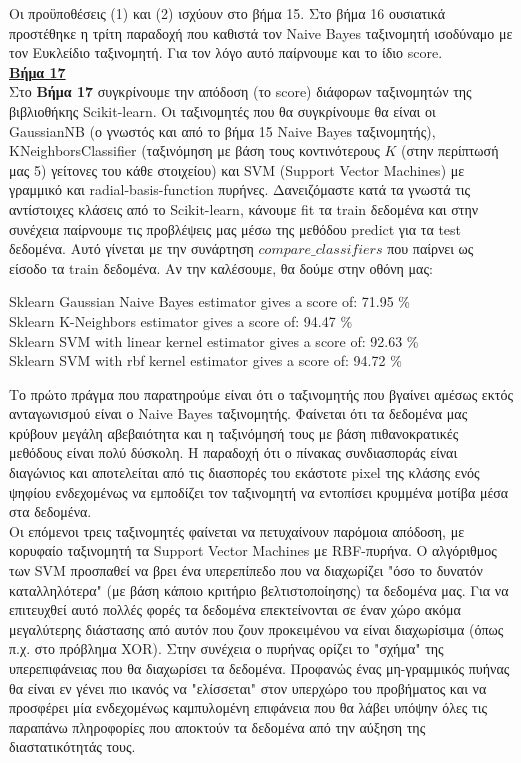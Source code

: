 \documentclass[11pt]{article} %
\begin{document}
Οι προϋποθέσεις (1) και (2) ισχύουν στο βήμα 15. Στο βήμα 16 ουσιατικά προστέθηκε η τρίτη παραδοχή που καθιστά τον Naive Bayes ταξινομητή ισοδύναμο με τον Ευκλείδιο ταξινομητή. Για τον λόγο αυτό παίρνουμε και το ίδιο score.\\

\underline{\textbf{Βήμα 17}}\\

Στο \textbf{Βήμα 17} συγκρίνουμε την απόδοση (το score) διάφορων ταξινομητών της βιβλιοθήκης Scikit-learn. Οι ταξινομητές που θα συγκρίνουμε θα είναι οι GaussianNB (ο γνωστός και από το βήμα 15 Naive Bayes ταξινομητής), KNeighborsClassifier (ταξινόμηση με βάση τους κοντινότερους $Κ$ (στην περίπτωσή μας 5) γείτονες του κάθε στοιχείου) και SVM (Support Vector Machines) με γραμμικό και radial-basis-function πυρήνες. Δανειζόμαστε κατά τα γνωστά τις αντίστοιχες κλάσεις από το Scikit-learn, κάνουμε fit τα train δεδομένα και στην συνέχεια παίρνουμε τις προβλέψεις μας μέσω της μεθόδου predict για τα test δεδομένα. Αυτό γίνεται με την συνάρτηση $compare\_classifiers$ που παίρνει ως είσοδο τα train δεδομένα. Αν την καλέσουμε, θα δούμε στην οθόνη μας:\\
\begin{center}
Sklearn Gaussian Naive Bayes estimator gives a score of: 71.95 \%\\
Sklearn K-Neighbors estimator gives a score of: 94.47 \%\\
Sklearn SVM with linear kernel estimator gives a score of: 92.63 \%\\
Sklearn SVM with rbf kernel estimator gives a score of: 94.72 \%\\
\end{center}

Το πρώτο πράγμα που παρατηρούμε είναι ότι ο ταξινομητής που βγαίνει αμέσως εκτός ανταγωνισμού είναι ο Naive Bayes ταξινομητής. Φαίνεται ότι τα δεδομένα μας κρύβουν μεγάλη αβεβαιότητα και η ταξινόμησή τους με βάση πιθανοκρατικές μεθόδους είναι πολύ δύσκολη. Η παραδοχή ότι ο πίνακας συνδιασποράς είναι διαγώνιος και αποτελείται από τις διασπορές του εκάστοτε pixel της κλάσης ενός ψηφίου ενδεχομένως να εμποδίζει τον ταξινομητή να εντοπίσει κρυμμένα μοτίβα μέσα στα δεδομένα.\\

Οι επόμενοι τρεις ταξινομητές φαίνεται να πετυχαίνουν παρόμοια απόδοση, με κορυφαίο ταξινομητή τα Support Vector Machines με RBF-πυρήνα. Ο αλγόριθμος των SVM  προσπαθεί να βρει ένα υπερεπίπεδο που να διαχωρίζει "όσο το δυνατόν καταλληλότερα" (με βάση κάποιο κριτήριο βελτιστοποίησης) τα δεδομένα μας. Για να επιτευχθεί αυτό πολλές φορές τα δεδομένα επεκτείνονται σε έναν χώρο ακόμα μεγαλύτερης διάστασης από αυτόν που ζουν προκειμένου να είναι διαχωρίσιμα (όπως π.χ. στο πρόβλημα XOR). Στην συνέχεια ο πυρήνας ορίζει το "σχήμα" της υπερεπιφάνειας που θα διαχωρίσει τα δεδομένα. Προφανώς ένας μη-γραμμικός πυήνας θα είναι εν γένει πιο ικανός να "ελίσσεται" στον υπερχώρο του προβήματος και να προσφέρει μία ενδεχομένως καμπυλομένη επιφάνεια που θα λάβει υπόψην όλες τις παραπάνω πληροφορίες που αποκτούν τα δεδομένα από την αύξηση της διαστατικότητάς τους.\\
\end{document}
